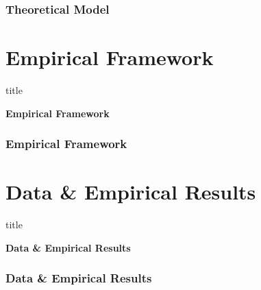 \documentclass[11pt]{beamer}
\begin{document}
\begin{frame}
	\frametitle{\bfseries Theoretical Model}
	
	
\end{frame}

\section[Framework]{Empirical Framework}
	\begin{frame}
	\begin{beamercolorbox}{title}
		\begin{center}
			\bfseries \huge Empirical Framework
		\end{center}	
	\end{beamercolorbox}
	
\end{frame}

\begin{frame}

	\frametitle{\bfseries Empirical Framework}
\end{frame}

\section[Data \& Results]{Data \& Empirical Results}
	\begin{frame}
	\begin{beamercolorbox}{title}
		\begin{center}
			\bfseries \huge Data \& Empirical Results
		\end{center}	
	\end{beamercolorbox}
	
\end{frame}

\begin{frame}

	\frametitle{\bfseries Data \& Empirical Results}
\end{frame}
\end{document}
